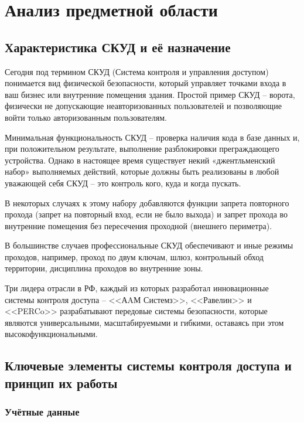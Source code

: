\section{Анализ предметной области}
\subsection{Характеристика СКУД и её назначение}

Сегодня под термином СКУД (Система контроля и управления доступом) понимается вид физической безопасности, который управляет точками входа в ваш бизнес или внутренние помещения здания. Простой пример СКУД -- ворота, физически не допускающие неавторизованных пользователей и позволяющие войти только авторизованным пользователям.

Минимальная функциональность СКУД – проверка наличия кода в базе данных и, при положительном результате, выполнение разблокировки преграждающего устройства. Однако в настоящее время существует некий «джентльменский набор» выполняемых действий, которые должны быть реализованы в любой уважающей себя СКУД – это контроль кого, куда и когда пускать.

В некоторых случаях к этому набору добавляются функции запрета повторного прохода (запрет на повторный вход, если не было выхода) и запрет прохода во внутренние помещения без пересечения проходной (внешнего периметра).

В большинстве случаев профессиональные СКУД обеспечивают и иные режимы проходов, например, проход по двум ключам,  шлюз, контрольный обход территории, дисциплина проходов во внутренние зоны.

Три лидера отрасли в РФ, каждый из которых разработал инновационные системы контроля доступа -- <<АAМ Системз>>, <<Равелин>> и <<PERCo>> разрабатывают передовые системы безопасности, которые являются универсальными, масштабируемыми и гибкими, оставаясь при этом высокофункциональными.

\subsection{Ключевые элементы системы контроля доступа и принцип их работы}
\subsubsection{Учётные данные}

